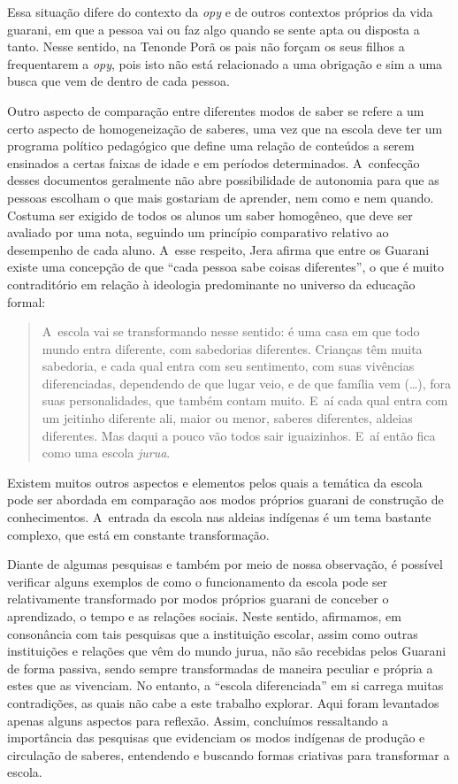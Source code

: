 Essa situação difere do contexto da \emph{opy} e de outros contextos próprios
da vida guarani, em que a pessoa vai ou faz algo quando se sente apta
ou disposta a tanto. Nesse sentido, na Tenonde Porã os pais não forçam
os seus filhos a frequentarem a \emph{opy}, pois isto não está relacionado a
uma obrigação e sim a uma busca que vem de dentro de cada pessoa.

Outro aspecto de comparação entre diferentes modos de saber se refere a
um certo aspecto de homogeneização de saberes, uma vez que na escola
deve ter um programa político pedagógico que define uma relação de
conteúdos a serem ensinados a certas faixas de idade e em períodos
determinados. A~confecção desses documentos geralmente não abre
possibilidade de autonomia para que as pessoas escolham o que mais
gostariam de aprender, nem como e nem quando. Costuma ser exigido de
todos os alunos um saber homogêneo, que deve ser avaliado por uma nota,
seguindo um princípio comparativo relativo ao desempenho de cada aluno.
A~esse respeito, Jera afirma que entre os Guarani existe uma concepção
de que ``cada pessoa sabe coisas diferentes'', o que é muito
contraditório em relação à ideologia predominante no universo da
educação formal: 

\begin{quote}
\noindent
A~escola vai se transformando nesse sentido: é uma casa em que todo
mundo entra diferente, com sabedorias diferentes. Crianças têm muita
sabedoria, e cada qual entra com seu sentimento, com suas vivências
diferenciadas, dependendo de que lugar veio, e de que família vem
(\ldots{}), fora suas personalidades, que também contam muito. E~aí cada
qual entra com um jeitinho diferente ali, maior ou menor, saberes
diferentes, aldeias diferentes. Mas daqui a pouco vão todos sair
iguaizinhos. E~aí então fica como uma escola \emph{jurua}.
\end{quote}

Existem muitos outros aspectos e elementos pelos quais a temática da
escola pode ser abordada em comparação aos modos próprios guarani de
construção de conhecimentos. A~entrada da escola nas aldeias indígenas
é um tema bastante complexo, que está em constante transformação.

Diante de algumas pesquisas e também por meio de nossa observação, é
possível verificar alguns exemplos de como o funcionamento da escola
pode ser relativamente transformado por modos próprios guarani de
conceber o aprendizado, o tempo e as relações sociais. Neste sentido,
afirmamos, em consonância com tais pesquisas que a instituição escolar,
assim como outras instituições e relações que vêm do mundo jurua, não
são recebidas pelos Guarani de forma passiva, sendo sempre
transformadas de maneira peculiar e própria a estes que as vivenciam.
No entanto, a ``escola diferenciada'' em si carrega muitas contradições,
as quais não cabe a este trabalho explorar. Aqui foram levantados
apenas alguns aspectos para reflexão. Assim, concluímos ressaltando a
importância das pesquisas que evidenciam os modos indígenas de produção
e circulação de saberes, entendendo e buscando formas criativas para
transformar a escola.

